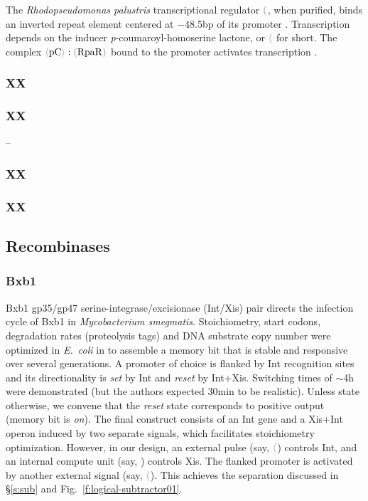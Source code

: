 \documentclass[12pt,notitlepage]{article}
\newcommand{\XOR}{\ensuremath{\mathop{\mathsf{xor}}}\xspace}
\newcommand{\cbra}[1]{{\ensuremath{\color{gray}{#1}}}}
\newcommand{\signal}[1]{{{\cbra{\langle}\ce{#1}\cbra{\rangle}}}}
\newcommand{\protein}[1]{{{\cbra{(}\ce{#1}\cbra{)}}}}
\newcommand{\ra}[1]{{\color{Blue}#1}}
\begin{document}
\ra{
The \emph{Rhodopseudomonas palustris} transcriptional regulator
\protein{RpaR},
when purified,
binds an inverted repeat element 
centered at $-48.5$bp
of its promoter
\cite{HirakawaETAL2011}.
%
%
Transcription depends on 
the inducer 
\emph{p}-coumaroyl-homoserine lactone,
or \signal{pC} for short.
%
%
%
%
The complex 
$\signal{pC} : \protein{RpaR}$
bound to the promoter
activates transcription
\cite[Discussion]{HirakawaETAL2011}.
}


\subsubsection*{XX}



\subsubsection*{XX}

\ra{--}

\subsubsection*{XX}



\subsubsection*{XX}




\subsection{Recombinases}

\subsubsection*{Bxb1}


Bxb1 gp35/gp47
serine-integrase/excisionase
(Int/Xis)
pair
directs the infection cycle of Bxb1 
in
\emph{Mycobacterium smegmatis}.
%
Stoichiometry, start codons,
degradation rates (proteolysis tags)
and DNA substrate copy number 
were optimized 
in \emph{E.~coli}
in \cite{BonnetSubsoontornEndy2012}
to 
assemble a memory bit
that is
stable and responsive over several generations.
%
A promoter of choice is flanked 
by Int recognition sites
and
its directionality is 
\emph{set}
by Int
and 
\emph{reset}
by Int+Xis.
%
Switching times of $\sim$4h were demonstrated
(but the authors expected 30min to be realistic).
%
Unless state otherwise,
we convene that
the \emph{reset} state corresponds to 
positive output (memory bit is \emph{on}).
%
The final construct
\cite[Fig.~4A]{BonnetSubsoontornEndy2012}
consists of an Int gene 
and
a Xis+Int operon
induced by two separate signals,
which facilitates stoichiometry optimization.
%
However, 
in our design,
an external pulse (say, \signal{w_B}) controls Int,
and
an internal compute unit (say, \ce{s_0 \XOR r_0}) controls Xis.
%
The flanked promoter is activated by another
external signal (say, \signal{w_A}).
%
This achieves the separation 
discussed in \S\ref{s:sub} and Fig.~\ref{f:logical-subtractor01}.
\end{document}
